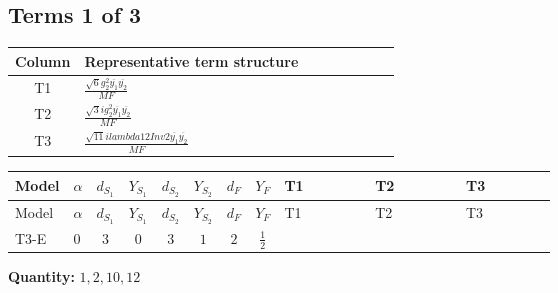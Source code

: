 \documentclass[8pt]{article}
\begin{document}
\begin{landscape}
\subsection*{Terms 1 of 3}
\begin{center}
\begin{tabular}{@{}c >{\raggedright\arraybackslash}p{0.82\linewidth}@{}}
\toprule
Column & Representative term structure \\
\midrule
T1 & \(\displaystyle \frac{\sqrt{6} g_{2}^{2} \overline{y_{1}} \overline{y_{2}}}{MF}\) \\
\midrule
T2 & \(\displaystyle \frac{\sqrt{3} i g_{2}^{2} \overline{y_{1}} \overline{y_{2}}}{MF}\) \\
\midrule
T3 & \(\displaystyle \frac{\sqrt{11} i lambda12Inv2 \overline{y_{1}} \overline{y_{2}}}{MF}\) \\
\midrule
\bottomrule
\end{tabular}
\end{center}
\smallskip
\tiny
\begin{longtable}{@{}llcccccc >{\raggedright\arraybackslash}p{0.21\linewidth} >{\raggedright\arraybackslash}p{0.21\linewidth} >{\raggedright\arraybackslash}p{0.21\linewidth}@{}}
\toprule
Model & $\alpha$ & $d_{S_1}$ & $Y_{S_1}$ & $d_{S_2}$ & $Y_{S_2}$ & $d_F$ & $Y_F$ & T1 & T2 & T3 \\
\midrule
\endfirsthead
\toprule
Model & $\alpha$ & $d_{S_1}$ & $Y_{S_1}$ & $d_{S_2}$ & $Y_{S_2}$ & $d_F$ & $Y_F$ & T1 & T2 & T3 \\
\midrule
\endhead
T3-E & $0$ & $3$ & $0$ & $3$ & $1$ & $2$ & $\frac{1}{2}$ & \scriptsize\adjustbox{max width=\linewidth}{$\begin{gathered} - \frac{\sqrt{6} g_{2}^{2} \overline{y_{1}} \overline{y_{2}}}{6 MF}\end{gathered}$} & \scriptsize\adjustbox{max width=\linewidth}{$\begin{gathered} - \frac{15 \sqrt{3} i g_{2}^{2} \overline{y_{1}} \overline{y_{2}}}{8 MF}\end{gathered}$} & \scriptsize\adjustbox{max width=\linewidth}{$\begin{gathered} - \frac{3 \sqrt{11} i lambda12Inv2 \overline{y_{1}} \overline{y_{2}}}{22 MF}\end{gathered}$} \\
\midrule
\bottomrule
\end{longtable}
\clearpage
\noindent\textbf{Quantity: }$\mathrm{1,2,10,12}$\par\smallskip

\end{landscape}
\end{document}
